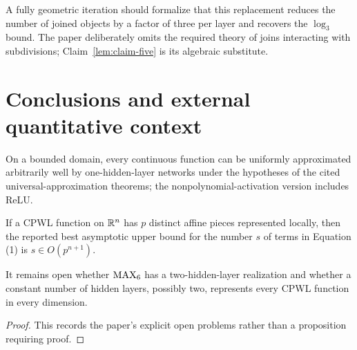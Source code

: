 \begin{proposition}
  \label{remark:geometric-recursion-gap}
  \notready
  A fully geometric iteration should formalize that this replacement reduces
  the number of joined objects by a factor of three per layer and recovers the
  $\log_3$ bound.  The paper deliberately omits the required theory of joins
  interacting with subdivisions; Claim~\ref{lem:claim-five} is its algebraic
  substitute.
\end{proposition}

\chapter{Conclusions and external quantitative context}

\begin{theorem}
  \label{thm:universal-approximation}
  \notready
  On a bounded domain, every continuous function can be uniformly approximated
  arbitrarily well by one-hidden-layer networks under the hypotheses of the
  cited universal-approximation theorems; the nonpolynomial-activation version
  includes ReLU.
\end{theorem}

\begin{proposition}
  \label{prop:wang-sun-term-count}
  \notready
  If a CPWL function on $\mathbb{R}^n$ has $p$ distinct affine pieces represented
  locally, then the reported best asymptotic upper bound for the number $s$ of
  terms in Equation (1) is $s\in O(p^{n+1})$.
\end{proposition}

\begin{proposition}
  \label{remark:open-depth-questions}
  It remains open whether $\operatorname{MAX}_6$ has a two-hidden-layer realization and
  whether a constant number of hidden layers, possibly two, represents every
  CPWL function in every dimension.
\end{proposition}
\begin{proof}
  This records the paper's explicit open problems rather than a proposition
  requiring proof.
\end{proof}

